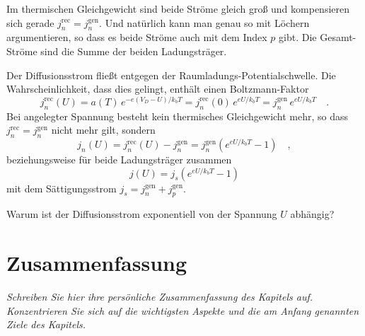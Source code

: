 Im thermischen Gleichgewicht sind beide Ströme gleich groß und kompensieren sich gerade $j_n^\text{rec} = j_n^\text{gen}$. Und natürlich kann man genau so mit Löchern argumentieren, so dass es beide Ströme auch mit dem Index $p$ gibt. Die Gesamt-Ströme sind die Summe der beiden Ladungsträger.

Der Diffusionsstrom fließt entgegen der Raumladungs-Potentialschwelle. Die Wahrscheinlichkeit, dass dies gelingt, enthält einen Boltzmann-Faktor
\begin{equation}
    j_n^\text{rec}(U) = a(T) \, e^{-e (V_D - U) / k_b T} =  j_n^\text{rec}(0) \, e^{e U / k_b T}
    = j_n^\text{gen} \, e^{e U / k_b T}
    \quad .
\end{equation}
Bei angelegter Spannung besteht kein thermisches Gleichgewicht mehr, so dass $j_n^\text{rec} = j_n^\text{gen}$ nicht mehr gilt, sondern
\begin{equation}
    j_n(U) = j_n^\text{rec}(U) - j_n^\text{gen} = j_n^\text{gen} \left(  e^{e U / k_b T} - 1 \right) \quad ,
\end{equation}
beziehungsweise für beide Ladungsträger zusammen 
\begin{equation}
    j(U) =  j_s \left(  e^{e U / k_b T} - 1 \right)
\end{equation}
mit dem Sättigungsstrom $j_s = j_n^\text{gen}  + j_p^\text{gen} $.

\begin{questions}
    \item Warum ist der Diffusionsstrom exponentiell von der Spannung $U$ abhängig?
\end{questions}

\newpage
\section{Zusammenfassung}

\textit{Schreiben Sie hier ihre persönliche Zusammenfassung des Kapitels auf. Konzentrieren Sie sich auf die wichtigsten Aspekte und die am Anfang genannten Ziele des Kapitels.}

\vspace*{10cm}

\printbibliography[segment=\therefsegment,heading=subbibliography]
